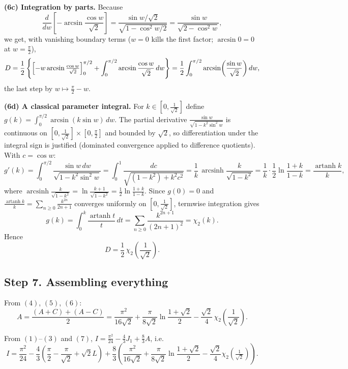 \documentclass[11pt]{article}
\theoremstyle{remark}
\begin{document}
\textbf{(6c) Integration by parts.} Because
\[\frac{d}{dw}\left[-\arcsin\frac{\cos w}{\sqrt2}\right]
=\frac{\sin w/\sqrt2}{\sqrt{1-\cos^2w/2}}
=\frac{\sin w}{\sqrt{2-\cos^2 w}},\]
we get, with vanishing boundary terms ($w=0$ kills the first factor; $\arcsin 0=0$ at $w=\frac\pi2$),
\[D=\frac12\left\{\Bigl[-w\arcsin\tfrac{\cos w}{\sqrt2}\Bigr]_0^{\pi/2}
+\int_0^{\pi/2}\arcsin\frac{\cos w}{\sqrt2}\,dw\right\}
=\frac12\int_0^{\pi/2}\arcsin\!\left(\frac{\sin w}{\sqrt2}\right)dw,\]
the last step by $w\mapsto\frac\pi2-w$.

\textbf{(6d) A classical parameter integral.} For $k\in[0,\tfrac1{\sqrt2}]$ define
$g(k)=\int_0^{\pi/2}\arcsin(k\sin w)\,dw$. The partial derivative
$\frac{\sin w}{\sqrt{1-k^2\sin^2w}}$ is continuous on $[0,\tfrac{1}{\sqrt2}]\times[0,\tfrac\pi2]$ and bounded by $\sqrt2$, so differentiation under the integral sign is justified (dominated convergence applied to difference quotients). With $c=\cos w$:
\[g'(k)=\int_0^{\pi/2}\frac{\sin w\,dw}{\sqrt{1-k^2\sin^2 w}}
=\int_0^1\frac{dc}{\sqrt{(1-k^2)+k^2c^2}}
=\frac1k\,\operatorname{arcsinh}\frac{k}{\sqrt{1-k^2}}
=\frac1k\cdot\frac12\ln\frac{1+k}{1-k}
=\frac{\operatorname{artanh}k}{k},\]
where $\operatorname{arcsinh}\frac{k}{\sqrt{1-k^2}}=\ln\frac{k+1}{\sqrt{1-k^2}}=\frac12\ln\frac{1+k}{1-k}$. Since $g(0)=0$ and $\frac{\operatorname{artanh}k}{k}=\sum_{n\ge0}\frac{k^{2n}}{2n+1}$ converges uniformly on $[0,\tfrac1{\sqrt2}]$, termwise integration gives
\[g(k)=\int_0^{k}\frac{\operatorname{artanh}t}{t}\,dt=\sum_{n\ge0}\frac{k^{2n+1}}{(2n+1)^2}=\chi_2(k).\]
Hence
\begin{equation*}
D=\frac12\,\chi_2\!\left(\frac{1}{\sqrt2}\right). \tag{6}
\end{equation*}

\subsection*{Step 7. Assembling everything}

From $(4)$, $(5)$, $(6)$:
\begin{equation*}
A=\frac{(A+C)+(A-C)}2
=\frac{\pi^2}{16\sqrt2}
+\frac{\pi}{8\sqrt2}\ln\frac{1+\sqrt2}{2}
-\frac{\sqrt2}{4}\,\chi_2\!\left(\frac1{\sqrt2}\right). \tag{7}
\end{equation*}

From $(1)$--$(3)$ and $(7)$, $I=\frac{\pi^2}{24}-\frac43J_1+\frac83A$, i.e.
\[I=\frac{\pi^2}{24}
-\frac43\left(\frac\pi2-\frac{\pi}{\sqrt2}+\sqrt2 L\right)
+\frac83\left(\frac{\pi^2}{16\sqrt2}+\frac{\pi}{8\sqrt2}\ln\frac{1+\sqrt2}{2}-\frac{\sqrt2}{4}\chi_2\!\left(\tfrac1{\sqrt2}\right)\right).\]
\end{document}
